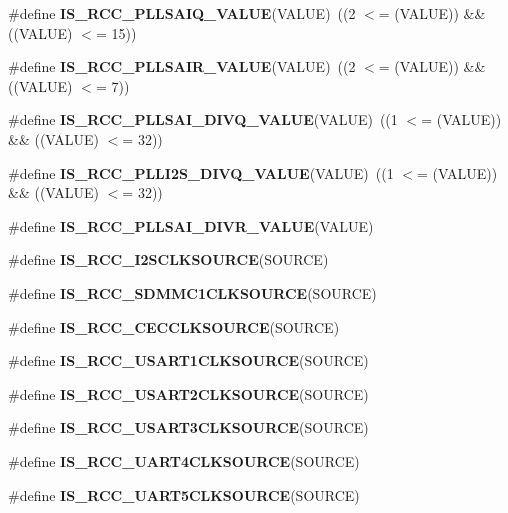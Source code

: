 \begin{DoxyCompactItemize}
\#define {\bfseries I\+S\+\_\+\+R\+C\+C\+\_\+\+P\+L\+L\+S\+A\+I\+Q\+\_\+\+V\+A\+L\+UE}(V\+A\+L\+UE)~((2 $<$= (V\+A\+L\+UE)) \&\& ((V\+A\+L\+UE) $<$= 15))
\item 
\mbox{\label{group___r_c_c_ex___i_s___r_c_c___definitions_ga62ec96fd175b9eaa54709bf76f5a344b}} 
\#define {\bfseries I\+S\+\_\+\+R\+C\+C\+\_\+\+P\+L\+L\+S\+A\+I\+R\+\_\+\+V\+A\+L\+UE}(V\+A\+L\+UE)~((2 $<$= (V\+A\+L\+UE)) \&\& ((V\+A\+L\+UE) $<$= 7))
\item 
\mbox{\label{group___r_c_c_ex___i_s___r_c_c___definitions_gade1d727f609c44d4b13a57261edffaf9}} 
\#define {\bfseries I\+S\+\_\+\+R\+C\+C\+\_\+\+P\+L\+L\+S\+A\+I\+\_\+\+D\+I\+V\+Q\+\_\+\+V\+A\+L\+UE}(V\+A\+L\+UE)~((1 $<$= (V\+A\+L\+UE)) \&\& ((V\+A\+L\+UE) $<$= 32))
\item 
\mbox{\label{group___r_c_c_ex___i_s___r_c_c___definitions_gac5c5714485768563fbfc6aafaf1084b7}} 
\#define {\bfseries I\+S\+\_\+\+R\+C\+C\+\_\+\+P\+L\+L\+I2\+S\+\_\+\+D\+I\+V\+Q\+\_\+\+V\+A\+L\+UE}(V\+A\+L\+UE)~((1 $<$= (V\+A\+L\+UE)) \&\& ((V\+A\+L\+UE) $<$= 32))
\item 
\#define {\bfseries I\+S\+\_\+\+R\+C\+C\+\_\+\+P\+L\+L\+S\+A\+I\+\_\+\+D\+I\+V\+R\+\_\+\+V\+A\+L\+UE}(V\+A\+L\+UE)
\item 
\#define {\bfseries I\+S\+\_\+\+R\+C\+C\+\_\+\+I2\+S\+C\+L\+K\+S\+O\+U\+R\+CE}(S\+O\+U\+R\+CE)
\item 
\#define {\bfseries I\+S\+\_\+\+R\+C\+C\+\_\+\+S\+D\+M\+M\+C1\+C\+L\+K\+S\+O\+U\+R\+CE}(S\+O\+U\+R\+CE)
\item 
\#define {\bfseries I\+S\+\_\+\+R\+C\+C\+\_\+\+C\+E\+C\+C\+L\+K\+S\+O\+U\+R\+CE}(S\+O\+U\+R\+CE)
\item 
\#define {\bfseries I\+S\+\_\+\+R\+C\+C\+\_\+\+U\+S\+A\+R\+T1\+C\+L\+K\+S\+O\+U\+R\+CE}(S\+O\+U\+R\+CE)
\item 
\#define {\bfseries I\+S\+\_\+\+R\+C\+C\+\_\+\+U\+S\+A\+R\+T2\+C\+L\+K\+S\+O\+U\+R\+CE}(S\+O\+U\+R\+CE)
\item 
\#define {\bfseries I\+S\+\_\+\+R\+C\+C\+\_\+\+U\+S\+A\+R\+T3\+C\+L\+K\+S\+O\+U\+R\+CE}(S\+O\+U\+R\+CE)
\item 
\#define {\bfseries I\+S\+\_\+\+R\+C\+C\+\_\+\+U\+A\+R\+T4\+C\+L\+K\+S\+O\+U\+R\+CE}(S\+O\+U\+R\+CE)
\item 
\#define {\bfseries I\+S\+\_\+\+R\+C\+C\+\_\+\+U\+A\+R\+T5\+C\+L\+K\+S\+O\+U\+R\+CE}(S\+O\+U\+R\+CE)

\end{DoxyCompactItemize}
